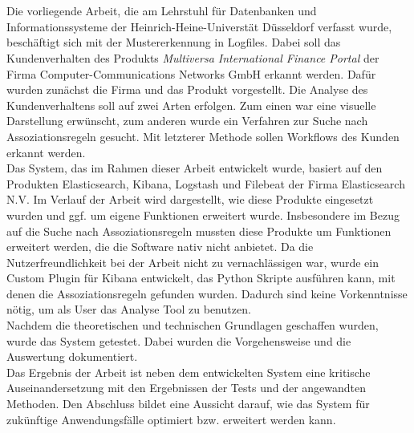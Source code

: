 \section*{}
Die vorliegende Arbeit, die am Lehrstuhl für Datenbanken und Informationssysteme der Heinrich-Heine-Universtät Düsseldorf verfasst wurde, beschäftigt sich mit der Mustererkennung in Logfiles. Dabei soll das Kundenverhalten des Produkts \textit{Multiversa International Finance Portal} der Firma Computer-Communications Networks GmbH erkannt werden. Dafür wurden zunächst die Firma und das Produkt vorgestellt.
Die Analyse des Kundenverhaltens soll auf zwei Arten erfolgen. Zum einen war eine visuelle Darstellung erwünscht, zum anderen wurde ein Verfahren zur Suche nach Assoziationsregeln gesucht. Mit letzterer Methode sollen Workflows des Kunden erkannt werden.\\

Das System, das im Rahmen dieser Arbeit entwickelt wurde, basiert auf den Produkten Elasticsearch, Kibana, Logstash und Filebeat der Firma Elasticsearch N.V. Im Verlauf der Arbeit wird dargestellt, wie diese Produkte eingesetzt wurden und ggf. um eigene Funktionen erweitert wurde. Insbesondere im Bezug auf die Suche nach Assoziationsregeln mussten diese Produkte um Funktionen erweitert werden, die die Software nativ nicht anbietet. Da die Nutzerfreundlichkeit bei der Arbeit nicht zu vernachlässigen war, wurde ein Custom Plugin für Kibana entwickelt, das Python Skripte ausführen kann, mit denen die Assoziationsregeln gefunden wurden. Dadurch sind keine Vorkenntnisse nötig, um als User das Analyse Tool zu benutzen.\\

Nachdem die theoretischen und technischen Grundlagen geschaffen wurden, wurde das System getestet. Dabei wurden die Vorgehensweise und die Auswertung dokumentiert.\\
Das Ergebnis der Arbeit ist neben dem entwickelten System eine kritische Auseinandersetzung mit den Ergebnissen der Tests und der angewandten Methoden. Den Abschluss bildet eine Aussicht darauf, wie das System für zukünftige Anwendungsfälle optimiert bzw. erweitert werden kann.
